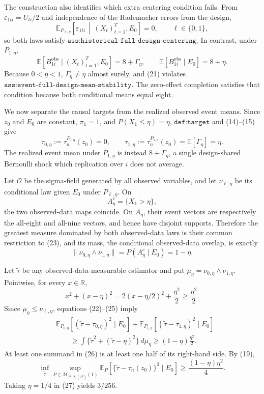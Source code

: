The construction also identifies which extra centering condition fails.  From \(\varepsilon_{1ti}=U_{ti}/2\) and independence of the Rademacher errors from the design,
\[
\mathbb E_{P_{\ell,\eta}}\!\left[
\varepsilon_{1ti}\,\middle|\,(X_t)_{t=1}^{T},E_0
\right]=0,
\qquad \ell\in\{0,1\},
\tag{20}
\]
so both laws satisfy \(\texttt{ass:historical-full-design-centering}\).  In contrast, under \(P_{1,\eta}\),
\[
\mathbb E[B_{1i}^{\mathrm{obs}}\mid(X_t)_{t=1}^{T},E_0]
=8+\Gamma_\eta,
\qquad
\mathbb E[B_{1i}^{\mathrm{obs}}\mid E_0]=8+\eta.
\tag{21}
\]
Because \(0<\eta<1\), \(\Gamma_\eta\ne\eta\) almost surely, and (21) violates \(\texttt{ass:event-full-design-mean-stability}\).  The zero-effect completion satisfies that condition because both conditional means equal eight.

We now separate the causal targets from the realized observed event means.  Since \(z_0\) and \(E_0\) are constant, \(\pi_1=1\), and \(P(X_1\le\eta)=\eta\), \(\texttt{def:target}\) and (14)--(15) give
\[
\tau_{0,\eta}:=\tau_n^{P_{0,\eta}}(z_0)=0,
\qquad
\tau_{1,\eta}:=\tau_n^{P_{1,\eta}}(z_0)
=\mathbb E[\Gamma_\eta]=\eta.
\tag{22}
\]
The realized event mean under \(P_{1,\eta}\) is instead \(8+\Gamma_\eta\), a single design-shared Bernoulli shock which replication over \(i\) does not average.

Let \(\mathcal O\) be the sigma-field generated by all observed variables, and let \(\nu_{\ell,\eta}\) be its conditional law given \(E_0\) under \(P_{\ell,\eta}\).  On
\[
A_\eta^c=\{X_1>\eta\},
\tag{23}
\]
the two observed-data maps coincide.  On \(A_\eta\), their event vectors are respectively the all-eight and all-nine vectors, and hence have disjoint supports.  Therefore the greatest measure dominated by both observed-data laws is their common restriction to (23), and its mass, the conditional observed-data overlap, is exactly
\[
\|\nu_{0,\eta}\wedge\nu_{1,\eta}\|
=P(A_\eta^c\mid E_0)=1-\eta.
\tag{24}
\]

Let \(\widetilde\tau\) be any observed-data-measurable estimator and put \(\mu_\eta=\nu_{0,\eta}\wedge\nu_{1,\eta}\).  Pointwise, for every \(x\in\mathbb R\),
\[
x^2+(x-\eta)^2
=2(x-\eta/2)^2+\frac{\eta^2}{2}
\ge\frac{\eta^2}{2}.
\tag{25}
\]
Since \(\mu_\eta\le\nu_{\ell,\eta}\), equations (22)--(25) imply
\[
\begin{aligned}
&\mathbb E_{P_{0,\eta}}[(\widetilde\tau-\tau_{0,\eta})^2\mid E_0]
+\mathbb E_{P_{1,\eta}}[(\widetilde\tau-\tau_{1,\eta})^2\mid E_0]\\
&\qquad\ge
\int\{\widetilde\tau^2+(\widetilde\tau-\eta)^2\}\,d\mu_\eta
\ge(1-\eta)\frac{\eta^2}{2}.
\end{aligned}
\tag{26}
\]
At least one summand in (26) is at least one half of its right-hand side.  By (19),
\[
\inf_{\widetilde\tau}
\sup_{P\in\mathcal M_{T^2,T,(T^2)}(1)}
\mathbb E_P[\{\widetilde\tau-\tau_n(z_0)\}^2\mid E_0]
\ge\frac{(1-\eta)\eta^2}{4}.
\tag{27}
\]
Taking \(\eta=1/4\) in (27) yields \(3/256\).

